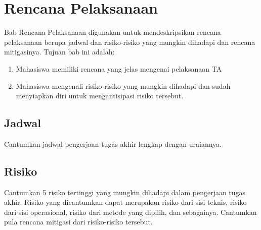 
\chapter{Rencana Pelaksanaan}

Bab Rencana Pelaksanaan digunakan untuk mendeskripsikan rencana pelaksanaan berupa jadwal dan risiko-risiko yang mungkin dihadapi dan rencana mitigasinya. Tujuan bab ini  adalah:
\begin{enumerate}
    \item Mahasiswa memiliki rencana yang jelas mengenai pelaksanaan TA
    \item Mahasiswa mengenali risiko-risiko yang mungkin dihadapi dan sudah menyiapkan diri untuk mengantisipasi risiko tersebut.
\end{enumerate}

\section{Jadwal}

Cantumkan jadwal pengerjaan tugas akhir lengkap dengan uraiannya.

\section{Risiko}

Cantumkan 5 risiko tertinggi yang mungkin dihadapi dalam pengerjaan tugas akhir. Risiko yang dicantumkan dapat merupakan risiko dari sisi teknis, risiko dari sisi operasional, risiko dari metode yang dipilih, dan sebagainya. Cantumkan pula rencana mitigasi dari risiko-risiko tersebut.